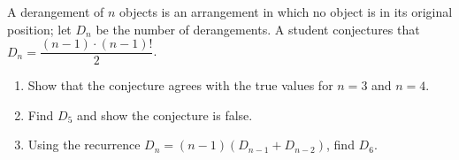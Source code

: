 A derangement of $n$ objects is an arrangement in which no object is in its original position; let $D_n$ be the number of derangements. A student conjectures that $D_n=\dfrac{(n-1)\cdot(n-1)!}{2}$.
\begin{enumerate}
\item Show that the conjecture agrees with the true values for $n=3$ and $n=4$.
\item Find $D_5$ and show the conjecture is false.
\item Using the recurrence $D_n=(n-1)(D_{n-1}+D_{n-2})$, find $D_6$.
\end{enumerate}
